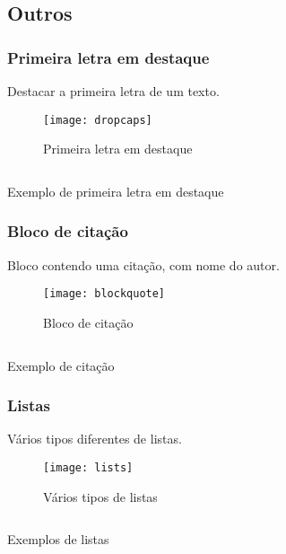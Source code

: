 \subsection{Outros}


\subsubsection{Primeira letra em destaque}

Destacar a primeira letra de um texto.

\begin{figure}[!ht]
    \centering
    \texttt{[image: dropcaps]}
    \caption{Primeira letra em destaque}\label{RS0001:fig:dropcaps}
\end{figure}

\begin{code}
    \inputminted[label=dropcaps.html]{html}{../RS0001/anexos/dropcaps.html}
    \caption{Exemplo de primeira letra em destaque}\label{RS0001:code:exemplo-dropcaps}
\end{code}


\subsubsection{Bloco de citação}

Bloco contendo uma citação, com nome do autor.

\begin{figure}[!ht]
    \centering
    \texttt{[image: blockquote]}
    \caption{Bloco de citação}\label{RS0001:fig:blockquote}
\end{figure}

\begin{code}
    \inputminted[label=blockquote.html]{html}{../RS0001/anexos/blockquote.html}
    \caption{Exemplo de citação}\label{RS0001:code:exemplo-blockquote}
\end{code}


\subsubsection{Listas}

Vários tipos diferentes de listas.

\begin{figure}[!ht]
    \centering
    \texttt{[image: lists]}
    \caption{Vários tipos de listas}\label{RS0001:fig:lists}
\end{figure}

\begin{code}
    \inputminted[label=lists.html]{html}{../RS0001/anexos/lists.html}
    \caption{Exemplos de listas}\label{RS0001:code:exemplo-lists}
\end{code}


